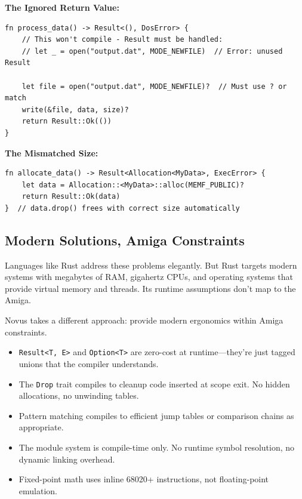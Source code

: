 \textbf{The Ignored Return Value:}
\begin{lstlisting}
fn process_data() -> Result<(), DosError> {
    // This won't compile - Result must be handled:
    // let _ = open("output.dat", MODE_NEWFILE)  // Error: unused Result

    let file = open("output.dat", MODE_NEWFILE)?  // Must use ? or match
    write(&file, data, size)?
    return Result::Ok(())
}
\end{lstlisting}

\textbf{The Mismatched Size:}
\begin{lstlisting}
fn allocate_data() -> Result<Allocation<MyData>, ExecError> {
    let data = Allocation::<MyData>::alloc(MEMF_PUBLIC)?
    return Result::Ok(data)
}  // data.drop() frees with correct size automatically
\end{lstlisting}

\subsection{Modern Solutions, Amiga Constraints}

Languages like Rust address these problems elegantly. But Rust targets modern systems with megabytes of RAM, gigahertz CPUs, and operating systems that provide virtual memory and threads. Its runtime assumptions don't map to the Amiga.

Novus takes a different approach: provide modern ergonomics within Amiga constraints.

\begin{itemize}
    \item \texttt{Result<T, E>} and \texttt{Option<T>} are zero-cost at runtime---they're just tagged unions that the compiler understands.

    \item The \texttt{Drop} trait compiles to cleanup code inserted at scope exit. No hidden allocations, no unwinding tables.

    \item Pattern matching compiles to efficient jump tables or comparison chains as appropriate.

    \item The module system is compile-time only. No runtime symbol resolution, no dynamic linking overhead.

    \item Fixed-point math uses inline 68020+ instructions, not floating-point emulation.
\end{itemize}

